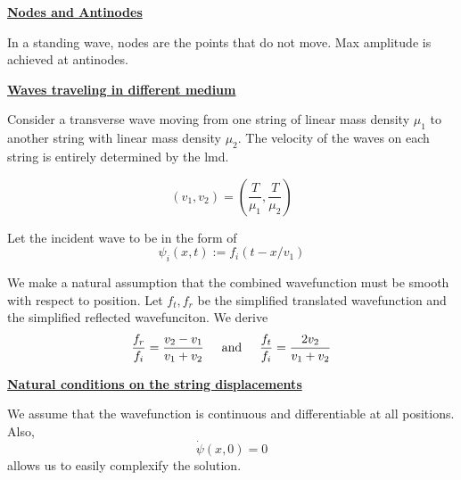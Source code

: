\documentclass{article}
\newcommand{\new}[1]{
    \vspace{2mm}
    \noindent
    \textbf{
    \underline{#1}}
}
\newcommand{\textAnd}{
    {
        \hspace{5mm}
        \textrm{and}
        \hspace{5mm}
    }
}
\begin{document}
\new{Nodes and Antinodes}
In a standing wave, nodes are the points that do not move. 
Max amplitude is achieved at antinodes. 

\new{Waves traveling in different medium}
Consider a transverse wave moving from one string 
of linear mass density $\mu_1$ to another string with linear 
mass density $\mu_2$.
The velocity of the waves on each string is entirely determined 
by the lmd. 

\[
    (v_1, v_2) = \left(
        \frac{T}{\mu_1}
        ,
        \frac{T}{\mu_2}
    \right)
\]

Let the incident wave to be in the form of 
\[
    \psi_i(x, t) := f_i(t - x/v_1) 
\]

We make a natural assumption that the combined 
wavefunction must be smooth with respect to position. 
Let $f_t, f_r$ be the simplified translated wavefunction 
and the simplified reflected wavefunciton. 
We derive 
\[
    \frac{f_r}{f_i} = \frac{v_2 - v_1}{
        v_1 + v_2
    }
    \textAnd 
    \frac{f_t}{f_i} = \frac{2v_2}{v_1 + v_2}
\]

\new{Natural conditions on the string displacements}
We assume that the wavefunction is continuous and 
differentiable at all positions. Also, 
\[
    \dot\psi(x, 0) = 0
\]
allows us to easily complexify the solution. 


\normalsize 
\end{document}
